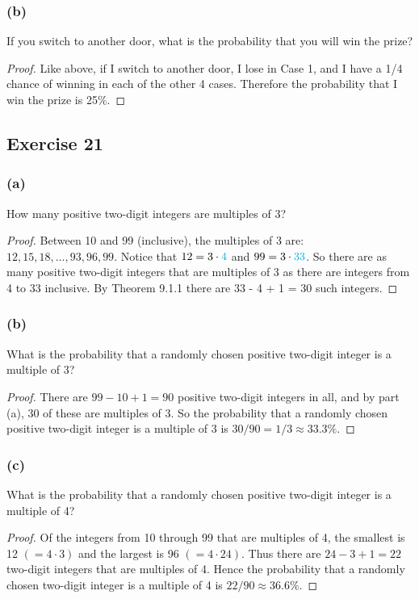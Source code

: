 \documentclass[14pt]{extarticle}
\newcommand{\cy}{\color{cyan}}
\begin{document}
\subsubsection{(b)}
If you switch to another door, what is the probability that you will win the prize?

\begin{proof}
Like above, if I switch to another door, I lose in Case 1, and I have a 1/4 chance of winning in each of the other 4 
cases. Therefore the probability that I win the prize is 25\%.
\end{proof}

\subsection{Exercise 21}
\subsubsection{(a)}
How many positive two-digit integers are multiples of 3?

\begin{proof}
Between 10 and 99 (inclusive), the multiples of 3 are: \(12, 15, 18, \ldots, 93, 96, 99\). Notice that
\(12 = 3 \cdot {\cy 4}\) and \(99 = 3 \cdot {\cy 33}\). So there are as many positive two-digit integers that are 
multiples of 3 as there are integers from 4 to 33 inclusive. By Theorem 9.1.1 there are 33 - 4 + 1 = 30 such
integers.
\end{proof}

\subsubsection{(b)}
What is the probability that a randomly chosen positive two-digit integer is a multiple of 3?

\begin{proof}
There are \(99 - 10 + 1 = 90\) positive two-digit integers in all, and by part (a), 30 of these are multiples of 3. So 
the probability that a randomly chosen positive two-digit integer is a multiple of 3 is \(30/90=1/3 \approx 33.3\%\).
\end{proof}

\subsubsection{(c)}
What is the probability that a randomly chosen positive two-digit integer is a multiple of 4?

\begin{proof}
Of the integers from 10 through 99 that are multiples of 4, the smallest is 12 \((= 4 \cdot 3)\) and the largest is 96 
\((= 4 \cdot 24)\). Thus there are \(24 - 3 + 1 = 22\) two-digit integers that are multiples of 4. Hence the 
probability that a randomly chosen two-digit integer is a multiple of 4 is \(22/90 \approx 36.6\%\).
\end{proof}
\end{document}
